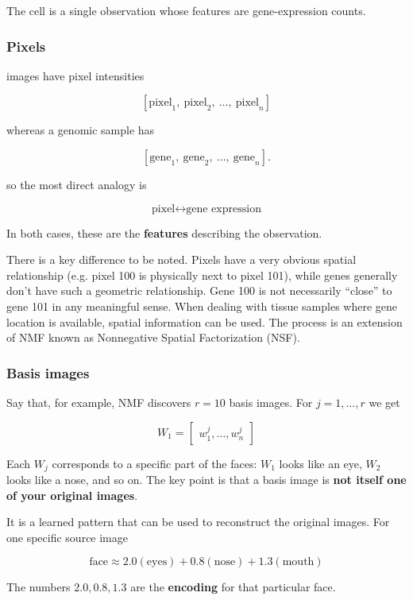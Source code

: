 \documentclass[11pt,a4paper]{article}
\begin{document}
The cell is a single observation whose features are gene-expression counts.

\subsubsection{Pixels}

images have pixel intensities

\[
[\text{pixel}_1,~\text{pixel}_2,~\ldots,~\text{pixel}_{n}]
\]

whereas a genomic sample has 

\[
[\text{gene}_1,~\text{gene}_2,~\ldots,~\text{gene}_{n}].
\]

so the most direct analogy is

\[
\boxed{
	\text{pixel}
	\longleftrightarrow
	\text{gene expression}
}
\]

In both cases, these are the \textbf{features} describing the observation.

There is a key difference to be noted. Pixels have a very obvious spatial relationship (e.g. pixel 100 is physically next to pixel 101), while genes generally don't have such a geometric relationship. Gene 100 is not necessarily ``close'' to gene 101 in any meaningful sense. When dealing with tissue samples where gene location is available, spatial information can be used. The process is an extension of NMF known as Nonnegative Spatial Factorization (NSF).

\subsubsection{Basis images}

Say that, for example, NMF discovers $r=10$ basis images. For $j = 1, ..., r$ we get 

\[
W_1 =
\begin{bmatrix}
w^j_1, \ldots , w^j_n
\end{bmatrix}
\]

Each $W_j$ corresponds to a specific part of the faces: $W_1$ looks like an eye, $W_2$ looks like a nose, and so on. The key point is that a basis image is \textbf{not itself one of your original images}.

It is a learned pattern that can be used to reconstruct the original images. For one specific source image

\[
\text{face}
\approx
2.0(\text{eyes})
+
0.8(\text{nose})
+
1.3(\text{mouth})
\]

The numbers $2.0,0.8,1.3$ are the \textbf{encoding} for that particular face.
\end{document}
